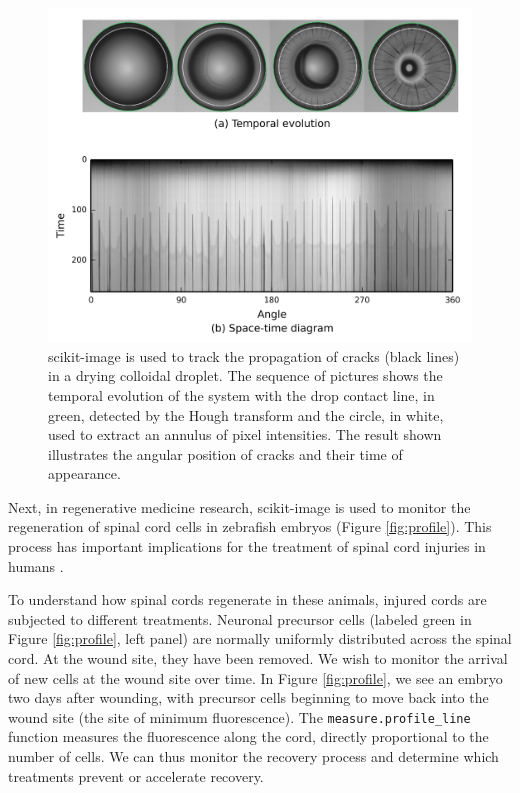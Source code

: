 \documentclass[fleqn,12pt]{wlpeerj}
\begin{document}
\begin{figure}[bht]
    \includegraphics[width=\columnwidth]{fig_cracks_new.png}

    \caption{scikit-image is used to track the propagation of cracks (black lines) in a drying colloidal droplet. The sequence of pictures shows the temporal evolution of the system with the drop contact line, in green, detected by the Hough transform and the circle, in white, used to extract an annulus of pixel intensities.  The result shown illustrates the angular position of cracks and their time of appearance. \label{fig:cracks}}
\end{figure}

Next, in regenerative medicine research, scikit-image is used to monitor the regeneration of spinal cord cells in zebrafish embryos (Figure \ref{fig:profile}). This process has important implications for the treatment of spinal cord injuries in humans \citep{Bhatt04,Thuret06}.

To understand how spinal cords regenerate in these animals, injured cords are subjected to different treatments. Neuronal precursor cells (labeled green in Figure \ref{fig:profile}, left panel) are normally uniformly distributed across the spinal cord. At the wound site, they have been removed. We wish to monitor the arrival of new cells at the wound site over time. In Figure \ref{fig:profile}, we see an embryo two days after wounding, with precursor cells beginning to move back into the wound site (the site of minimum fluorescence). The \texttt{measure.profile\_line} function measures the fluorescence along the cord, directly proportional to the number of cells. We can thus monitor the recovery process and determine which treatments prevent or accelerate recovery.
\end{document}
